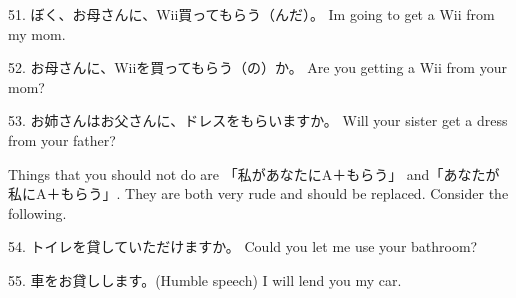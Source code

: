 \par{51. ぼく、お母さんに、Wii買ってもらう（んだ）。 \hfill\break
I\textquotesingle m going to get a Wii from my mom. }
 
\par{52. お母さんに、Wiiを買ってもらう（の）か。 \hfill\break
Are you getting a Wii from your mom? }
 
\par{53. お姉さんはお父さんに、ドレスをもらいますか。 \hfill\break
Will your sister get a dress from your father? }
 
\par{ Things that you should not do are 「私があなたにA＋もらう」 and「あなたが私にA＋もらう」. They are both very rude and should be replaced. Consider the following. }
 
\par{54. トイレを貸していただけますか。 \hfill\break
Could you let me use your bathroom? }
 
\par{55. 車をお貸しします。(Humble speech) \hfill\break
I will lend you my car. }
    